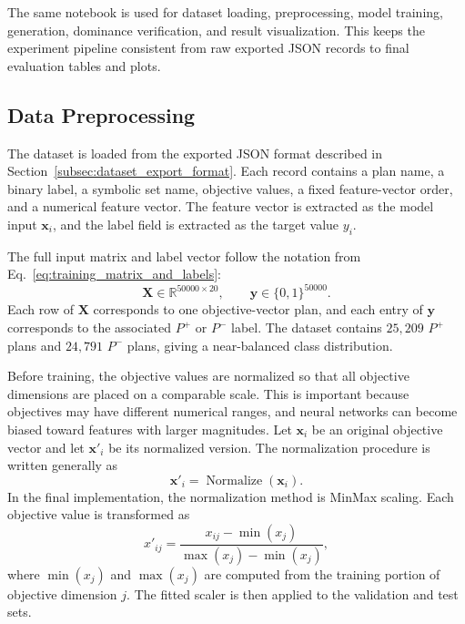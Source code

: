 The same notebook is used for dataset loading, preprocessing, model training, generation, dominance verification, and result visualization. This keeps the experiment pipeline consistent from raw exported JSON records to final evaluation tables and plots.

\subsection{Data Preprocessing}
\label{subsec:data_preprocessing}

The dataset is loaded from the exported JSON format described in Section~\ref{subsec:dataset_export_format}. Each record contains a plan name, a binary label, a symbolic set name, objective values, a fixed feature-vector order, and a numerical feature vector. The feature vector is extracted as the model input $\mathbf{x}_i$, and the label field is extracted as the target value $y_i$.

The full input matrix and label vector follow the notation from Eq.~\eqref{eq:training_matrix_and_labels}:
\begin{equation}
    \mathbf{X} \in \mathbb{R}^{50000 \times 20},
    \qquad
    \mathbf{y} \in \{0,1\}^{50000}.
    \label{eq:experimental_input_matrix}
\end{equation}
Each row of $\mathbf{X}$ corresponds to one objective-vector plan, and each entry of $\mathbf{y}$ corresponds to the associated $P^{+}$ or $P^{-}$ label. The dataset contains $25{,}209$ $P^{+}$ plans and $24{,}791$ $P^{-}$ plans, giving a near-balanced class distribution.

Before training, the objective values are normalized so that all objective dimensions are placed on a comparable scale. This is important because objectives may have different numerical ranges, and neural networks can become biased toward features with larger magnitudes. Let $\mathbf{x}_i$ be an original objective vector and let $\mathbf{x}'_i$ be its normalized version. The normalization procedure is written generally as
\begin{equation}
    \mathbf{x}'_i = \operatorname{Normalize}(\mathbf{x}_i).
    \label{eq:normalization_general}
\end{equation}
In the final implementation, the normalization method is MinMax scaling. Each objective value is transformed as
\begin{equation}
    x'_{ij}
    =
    \frac{x_{ij} - \min(x_j)}
    {\max(x_j)-\min(x_j)},
    \label{eq:minmax_scaling}
\end{equation}
where $\min(x_j)$ and $\max(x_j)$ are computed from the training portion of objective dimension $j$. The fitted scaler is then applied to the validation and test sets.

